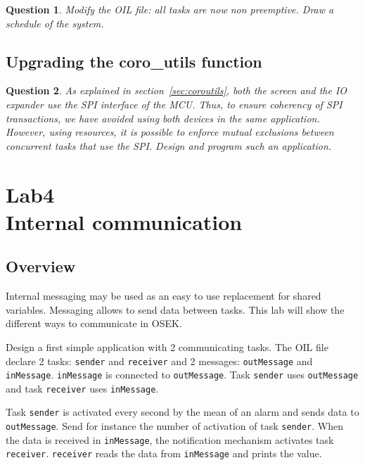 \documentclass[11pt]{report}
\newtheorem{ex}{Question}
\begin{document}
\begin{ex}
Modify the OIL file: all tasks are now non preemptive. Draw a schedule of the system.
\end{ex}


\section{Upgrading the coro\_utils function}

\begin{ex}
    As explained in section~\ref{sec:coroutils}, both the screen and the IO
    expander use the SPI interface of the MCU. Thus, to ensure coherency of SPI
    transactions, we have avoided using both devices in the same application.
    However, using resources, it is possible to enforce mutual exclusions
    between concurrent tasks that use the SPI.
    Design and program such an application.
\end{ex}

\chapter{Lab4\\Internal communication}

\section{Overview}

Internal messaging may be used as an easy to use replacement for shared variables. Messaging allows to send data between tasks. This lab will show the different ways to communicate in OSEK.

Design a first simple application with 2 communicating tasks.
The OIL file declare 2 tasks: \texttt{sender} and \texttt{receiver} and 2 messages: \texttt{outMessage} and \texttt{inMessage}. \texttt{inMessage} is connected to \texttt{outMessage}. Task \texttt{sender} uses \texttt{outMessage} and task \texttt{receiver} uses \texttt{inMessage}.

Task \texttt{sender} is activated every second by the mean of an alarm and sends data to \texttt{outMessage}.
Send for instance the number of activation of task \texttt{sender}.
When the data is received in \texttt{inMessage}, the notification mechanism activates task \texttt{receiver}.
\texttt{receiver} reads the data from \texttt{inMessage} and prints the value.
\end{document}
